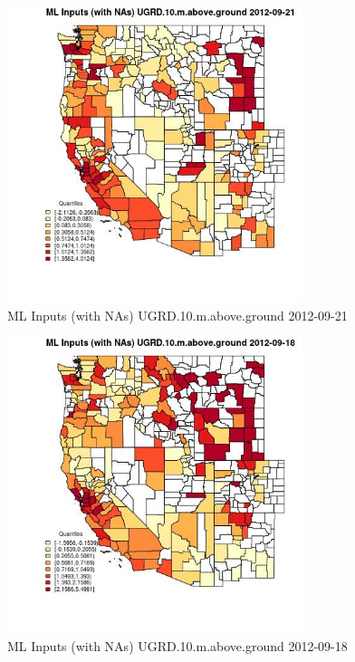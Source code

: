 \begin{figure} 
\centering  
\includegraphics[width=0.77\textwidth]{Code_Outputs/Report_ML_input_PM25_Step4_part_e_de_duplicated_aves_compiled_2019-05-14wNAs_CountyUGRD10mabovegroundMean2012-09-21_2012-09-21.jpg} 
\caption{\label{fig:Report_ML_input_PM25_Step4_part_e_de_duplicated_aves_compiled_2019-05-14wNAsCountyUGRD10mabovegroundMean2012-09-21_2012-09-21}ML Inputs (with NAs) UGRD.10.m.above.ground 2012-09-21} 
\end{figure} 
 

\begin{figure} 
\centering  
\includegraphics[width=0.77\textwidth]{Code_Outputs/Report_ML_input_PM25_Step4_part_e_de_duplicated_aves_compiled_2019-05-14wNAs_CountyUGRD10mabovegroundMean2012-09-18_2012-09-18.jpg} 
\caption{\label{fig:Report_ML_input_PM25_Step4_part_e_de_duplicated_aves_compiled_2019-05-14wNAsCountyUGRD10mabovegroundMean2012-09-18_2012-09-18}ML Inputs (with NAs) UGRD.10.m.above.ground 2012-09-18} 
\end{figure} 
 

